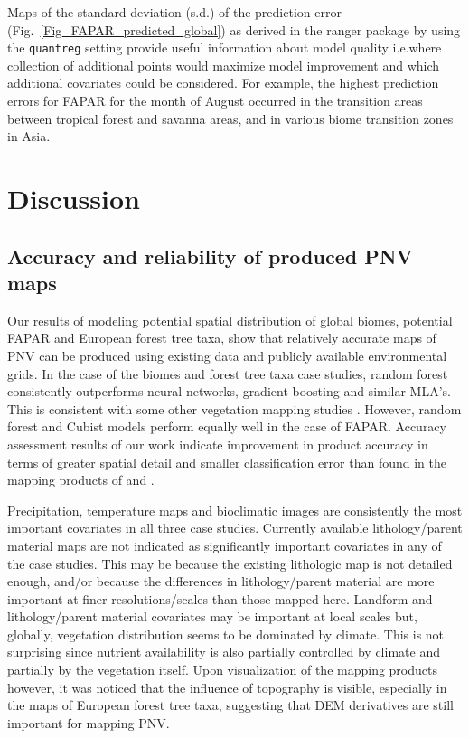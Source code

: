 \documentclass[fleqn,10pt,lineno]{wlpeerj} %
\begin{document}
Maps of the standard deviation (s.d.\@) of the prediction error (Fig.\@~\ref{Fig_FAPAR_predicted_global}) as derived in the \textsf{ranger} package by using the \verb"quantreg" setting \citep{meinshausen2006quantile} provide useful information about model quality i.e.\@ where collection of additional points would maximize model improvement and which additional covariates could be considered. For example, the highest prediction errors for FAPAR for the  month of August occurred in the transition areas between tropical forest and savanna areas, and in various biome transition zones in Asia. \par

\newpage
\section*{Discussion}

\subsection*{Accuracy and reliability of produced PNV maps}

Our results of modeling potential spatial distribution of global biomes, potential FAPAR and European forest tree taxa, show that relatively accurate maps of PNV can be produced using existing data and publicly available environmental grids. In the case of the biomes and forest tree taxa case studies, random forest consistently outperforms neural networks, gradient boosting and similar MLA's. This is consistent with some other vegetation mapping studies \citep{li2016comparison}. However, random forest and Cubist models perform equally well in the case of FAPAR. Accuracy assessment results of our work indicate improvement in product accuracy in terms of greater spatial detail and smaller classification error than found in the mapping products of \citet{levavasseur2012statistical} and \citet{tian2016terrestrial}. \par

Precipitation, temperature maps and bioclimatic images are consistently the most important covariates in all three case studies. Currently available lithology/parent material maps are not indicated as significantly important covariates in any of the case studies. This may be because the existing lithologic map \citep{GGGE:GGGE2352} is not detailed enough, and/or because the differences in lithology/parent material are more important at finer resolutions/scales than those mapped here. Landform and lithology/parent material covariates may be important at local scales but, globally, vegetation distribution seems to be dominated by climate. This is not surprising since nutrient availability is also partially controlled by climate and partially by the vegetation itself. Upon visualization of the mapping products however, it was noticed that the influence of topography is visible, especially in the maps of European forest tree taxa, suggesting that DEM derivatives are still important for mapping PNV.\par
\end{document}
